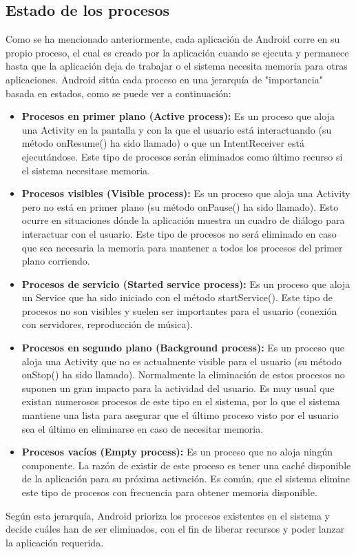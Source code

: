 \documentclass[letterpaper,12pt,openany,oneside]{book}
\begin{document}
\subsection {Estado de los procesos}
Como se ha mencionado anteriormente, cada aplicación de Android corre en su propio proceso, el cual es creado por la aplicación cuando se ejecuta y permanece hasta que la aplicación deja de trabajar o el sistema necesita memoria para otras aplicaciones. Android sitúa cada proceso en una jerarquía de "importancia" basada en estados, como se puede ver a continuación: 
\begin{itemize}
\item   \textbf{  Procesos en primer plano (Active process):} Es un proceso que aloja una Activity en la pantalla y con la que el usuario está interactuando (su método onResume() ha sido llamado) o que un IntentReceiver está ejecutándose. Este tipo de procesos serán eliminados como último recurso si el sistema necesitase memoria.
 
\item     \textbf{ Procesos visibles (Visible process):  }Es un proceso que aloja una Activity pero no está en primer plano (su método onPause() ha sido llamado). Esto ocurre en situaciones dónde la aplicación muestra un cuadro de diálogo para interactuar con el usuario. Este tipo de procesos no será eliminado en caso que sea necesaria la memoria para mantener a todos los procesos del primer plano corriendo.
 
\item   \textbf{    Procesos de servicio (Started service process):} Es un proceso que aloja un Service que ha sido iniciado con el método startService(). Este tipo de procesos no son visibles y suelen ser importantes para el usuario (conexión con servidores, reproducción de música).
 
\item     \textbf{ Procesos en segundo plano (Background process): }Es un proceso que aloja una Activity que no es actualmente visible para el usuario (su método onStop() ha sido llamado). Normalmente la eliminación de estos procesos no suponen un gran impacto para la actividad del usuario. Es muy usual que existan numerosos procesos de este tipo en el sistema, por lo que el sistema mantiene una lista para asegurar que el último proceso visto por el usuario sea el último en eliminarse en caso de necesitar memoria.
 
\item    \textbf{ Procesos vacíos (Empty process): }Es un proceso que no aloja ningún componente. La razón de existir de este proceso es tener una caché disponible de la aplicación para su próxima activación. Es común, que el sistema elimine este tipo de procesos con frecuencia para obtener memoria disponible.
 \end{itemize}
   Según esta jerarquía, Android prioriza los procesos existentes en el sistema y decide cuáles han de ser eliminados, con el fin de liberar recursos y poder lanzar la aplicación requerida.
\end{document}
